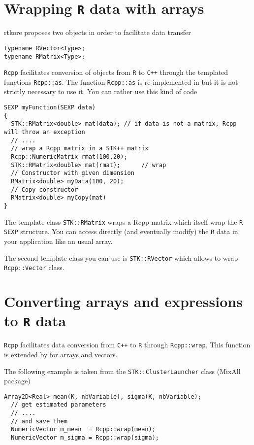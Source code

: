 \documentclass[a4paper,10pt]{article}
\begin{document}
\section{Wrapping \texttt{R} data with \stkpp{} arrays}

rtkore proposes two objects in order to facilitate data transfer
\begin{lstlisting}[style=customcpp]
typename RVector<Type>;
typename RMatrix<Type>;
\end{lstlisting}
\texttt{Rcpp} facilitates conversion of objects from \texttt{R} to
\texttt{C++} through the templated functions \texttt{Rcpp::as}.
The function \texttt{Rcpp::as} is re-implemented in \stkpp{} but
it is not strictly necessary to use it. You can rather use this kind
of code
\begin{lstlisting}[style=customcpp]
SEXP myFunction(SEXP data)
{
  STK::RMatrix<double> mat(data); // if data is not a matrix, Rcpp will throw an exception
  // ....
  // wrap a Rcpp matrix in a STK++ matrix
  Rcpp::NumericMatrix rmat(100,20);
  STK::RMatrix<double> mat(rmat);      // wrap
  // Constructor with given dimension
  RMatrix<double> myData(100, 20);
  // Copy constructor
  RMatrix<double> myCopy(mat)
}
\end{lstlisting}
The template class \texttt{STK::RMatrix} wraps a Rcpp matrix which itself
wrap the \texttt{R} \verb+SEXP+ structure. You can access directly (and
eventually modify) the \texttt{R} data in your application like
an usual \stkpp{} array.

The second template class you can use is \texttt{STK::RVector} which
allows to wrap \texttt{Rcpp::Vector} class.

\section{Converting \stkpp{} arrays and expressions to \texttt{R} data}

\texttt{Rcpp} facilitates data conversion from \texttt{C++} to \texttt{R}
through  \texttt{Rcpp::wrap}. This function is extended by \rtkore{} for \stkpp{}
arrays and vectors.

The following example is taken from the \texttt{STK::ClusterLauncher} class  (MixAll
package)
\begin{lstlisting}[style=customcpp]
  Array2D<Real> mean(K, nbVariable), sigma(K, nbVariable);
  // get estimated parameters
  // ....
  // and save them
  NumericVector m_mean  = Rcpp::wrap(mean);
  NumericVector m_sigma = Rcpp::wrap(sigma);
\end{lstlisting}
\end{document}
